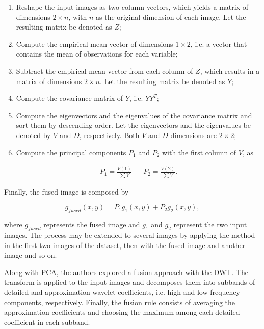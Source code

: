 \begin{enumerate}[label=\Roman* -]
    \item Reshape the input images as two-column vectors, which yields a matrix of dimensions $2 \times n$, with $n$ as the original dimension of each image. Let the resulting matrix be denoted as $Z$;
    
    \item Compute the empirical mean vector of dimensions $1 \times 2$, i.e. a vector that contains the mean of observations for each variable;
    
    \item Subtract the empirical mean vector from each column of $Z$, which results in a matrix of dimensions $2 \times n$. Let the resulting matrix be denoted as $Y$;
    
    \item Compute the covariance matrix of $Y$, i.e. $YY^{T}$;
    
    \item Compute the eigenvectors and the eigenvalues of the covariance matrix and sort them by descending order. Let the eigenvectors and the eigenvalues be denoted by $V$ and $D$, respectively. Both $V$ and $D$ dimensions are $2 \times 2$;
    
    \item Compute the principal components $P_{1}$ and $P_{2}$ with the first column of $V$, as
    
    \begin{align}
    P_{1} = \frac{V(1)}{\sum V}
    &&
    P_{2} = \frac{V(2)}{\sum V}.
    \end{align}
\end{enumerate}

\noindent Finally, the fused image is composed by

\begin{equation}
g_{fused}(x,y) = P_{1}g_{1}(x,y) + P_{2}g_{2}(x,y),
\end{equation}

\noindent where $g_{fused}$ represents the fused image and $g_{1}$ and $g_{2}$ represent the two input images. The process may be extended to several images by applying the method in the first two images of the dataset, then with the fused image and another image and so on.

Along with PCA, the authors explored a fusion approach with the DWT. The transform is applied to the input images and decomposes them into subbands of detailed and approximation wavelet coefficients, i.e. high and low-frequency components, respectively. Finally, the fusion rule consists of averaging the approximation coefficients and choosing the maximum among each detailed coefficient in each subband.

